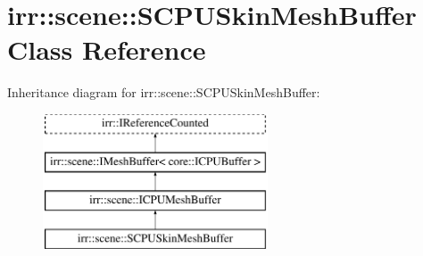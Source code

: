 \hypertarget{classirr_1_1scene_1_1SCPUSkinMeshBuffer}{}\section{irr\+:\+:scene\+:\+:S\+C\+P\+U\+Skin\+Mesh\+Buffer Class Reference}
\label{classirr_1_1scene_1_1SCPUSkinMeshBuffer}
Inheritance diagram for irr\+:\+:scene\+:\+:S\+C\+P\+U\+Skin\+Mesh\+Buffer\+:\begin{figure}[H]
\begin{center}
\leavevmode
\includegraphics[height=4.000000cm]{classirr_1_1scene_1_1SCPUSkinMeshBuffer}
\end{center}
\end{figure}

